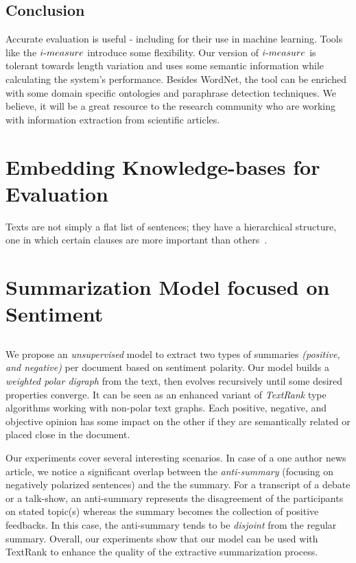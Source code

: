 \documentclass[a4paper]{report}
\begin{document}
\section{Conclusion}
Accurate evaluation is useful - including for their use in machine learning. Tools like the $i\hbox{-}measure$ introduce some flexibility. Our version of $i\hbox{-}measure$ is tolerant towards length variation and uses some semantic information while calculating the system's performance. Besides WordNet, the tool can be enriched with some domain specific ontologies and paraphrase detection techniques. We believe, it will be a great resource to the research community who are working with information extraction from scientific articles. \\ 


\chapter{Embedding Knowledge-bases for Evaluation}
Texts are not simply a flat list of sentences; they have a hierarchical structure, one in which certain clauses are more important than others~\cite{Hovy:1998:ATS:1119089.1119121}.

\chapter{Summarization Model focused on Sentiment}
\section*{}
We propose an \emph{unsupervised} model to extract two types of summaries \emph{(positive, and negative)} per document based on 
sentiment polarity. 
Our model builds a \emph{weighted polar digraph} from the text, then  evolves recursively 
until some desired properties converge. 
It can be seen as an enhanced variant of \emph{TextRank} type algorithms working with non-polar text graphs.
Each positive, negative, and objective opinion has some impact on the other if they are semantically related or placed close in the document. 
\par Our experiments cover several interesting scenarios.
In case of a one author news article, we notice a significant overlap between the {\em anti-summary}
 (focusing on negatively polarized sentences) and the the summary.  
For a transcript of a debate or a talk-show, an anti-summary
represents the disagreement of the participants on stated topic(s) 
whereas the summary becomes the collection of positive feedbacks.
In this case, the anti-summary tends to be \emph{disjoint} from the regular summary. 
Overall, our experiments show that our model 
can be used with TextRank to enhance the quality of the extractive summarization process.
\end{document}
